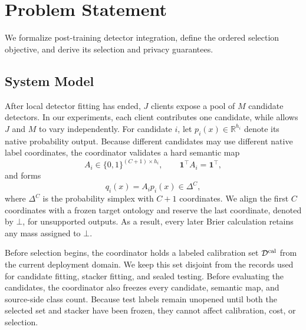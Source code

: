 \begingroup

\section{Problem Statement}
\label{sec:problem}

We formalize post-training detector integration, define the ordered selection
objective, and derive its selection and privacy guarantees.

\subsection{System Model}

After local detector fitting has ended, $J$ clients expose a pool of $M$
candidate detectors. In our experiments, each client contributes one candidate,
while \Fname allows $J$ and $M$ to vary independently. For candidate
$i$, let $p_i(x)\in\mathbb R^{h_i}$ denote its native probability output.
Because different candidates may use different native label coordinates, the
coordinator validates a hard semantic map
\begin{equation}
A_i\in\{0,1\}^{(C+1)\times h_i},
\qquad
\mathbf 1^\top A_i=\mathbf 1^\top,
\end{equation}
and forms
\begin{equation}
q_i(x)=A_i p_i(x)\in\Delta^{C},
\label{eq:aligned_output}
\end{equation}
where $\Delta^C$ is the probability simplex with $C+1$ coordinates. We align
the first $C$ coordinates with a frozen target ontology and reserve the last
coordinate, denoted by $\bot$, for unsupported outputs. As a result, every
later Brier calculation retains any mass assigned to $\bot$.

Before selection begins, the coordinator holds a labeled calibration set
$\mathcal D^{\rm cal}$ from the current deployment domain. We keep this set
disjoint from the records used for candidate fitting, stacker fitting, and sealed
testing. Before evaluating the candidates, the coordinator also freezes every
candidate, semantic map, and source-side class count. Because test labels
remain unopened until both the selected set and stacker have been frozen, they
cannot affect calibration, cost, or selection.

